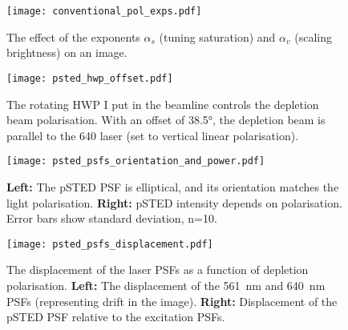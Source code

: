 \begin{figure}
	\centering
	\texttt{[image: conventional\_pol\_exps.pdf]}
	\caption{
		The effect of the exponents $ \alpha_s $ (tuning saturation) and $ \alpha_v $ (scaling brightness) on an image.
	}
	\label{fig:power law exponents}
\end{figure}

\begin{figure}
	\centering
	\texttt{[image: psted\_hwp\_offset.pdf]}
	\caption{
		The rotating HWP I put in the beamline controls the depletion beam polarisation. With an offset of 38.5°, the depletion beam is parallel to the 640 laser (set to vertical linear polarisation).
	}
	\label{fig:psted hwp offset}
\end{figure}

\begin{figure}
	\centering
	\texttt{[image: psted\_psfs\_orientation\_and\_power.pdf]}
	\caption{
		\textbf{Left:} The pSTED PSF is elliptical, and its orientation matches the light polarisation. \textbf{Right:} pSTED intensity depends on polarisation. Error bars show standard deviation, n=10.
	}
	\label{fig:psted psf orientation and power}
\end{figure}

\begin{figure}
	\centering
	\texttt{[image: psted\_psfs\_displacement.pdf]}
	\caption{
		The displacement of the laser PSFs as a function of depletion polarisation. \textbf{Left:} The displacement of the 561~nm and 640~nm PSFs (representing drift in the image). \textbf{Right:} Displacement of the pSTED PSF relative to the excitation PSFs.
	}
	\label{fig:psted displacement}
\end{figure}